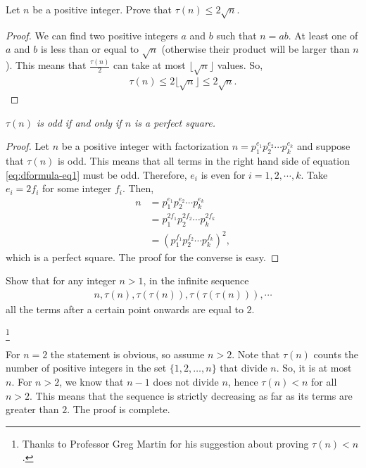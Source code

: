 \documentclass[12pt]{subfile}
\begin{document}
			\begin{theorem}\label{prop:tau(n)<2sqrt(n)}
				Let $n$ be a positive integer. Prove that $\tau(n) \leq 2 \sqrt n$.
			\end{theorem}
			
			\begin{proof}
				We can find two positive integers $a$ and $b$ such that $n=ab$. At least one of $a$ and $b$ is less than or equal to $\sqrt n$ (otherwise their product will be larger than $n$). This means that $\frac{\tau(n)}{2}$ can take at most $\lfloor \sqrt n \rfloor$ values. So,
					\begin{align*}
						\tau(n) \leq 2 \lfloor \sqrt n \rfloor \leq 2 \sqrt n.
					\end{align*}
			\end{proof}
			
			\begin{theorem}\slshape
				$\tau(n)$ is odd if and only if $n$ is a perfect square.
			\end{theorem}
			
			\begin{proof}
				Let $n$ be a positive integer with factorization $n=p_1^{e_1}p_2^{e_2}\cdots p_k^{e_k}$ and suppose that $\tau(n)$ is odd. This means that all terms in the right hand side of equation \eqref{eq:dformula-eq1} must be odd. Therefore, $e_i$ is even for $i=1,2,\cdots,k$. Take $e_i = 2f_i$ for some integer $f_i$. Then,
					\begin{align*}
						n &= p_1^{e_1}p_2^{e_2}\cdots p_k^{e_k}\\
						&= p_1^{2f_1}p_2^{2f_2}\cdots p_k^{2f_k}\\
						&= \left(p_1^{f_1}p_2^{f_2}\cdots p_k^{f_k}\right)^2,
					\end{align*}
				which is a perfect square. The proof for the converse is easy.
			\end{proof}
			
			\begin{problem}
				Show that for any integer $n>1$, in the infinite sequence
					\begin{align*}
						n, \tau(n), \tau(\tau(n)), \tau(\tau(\tau(n))),\cdots
					\end{align*}
				all the terms after a certain point onwards are equal to $2$. %
			\end{problem}
		
			\begin{solution}\footnote{Thanks to Professor Greg Martin for his suggestion about proving $\tau(n)<n$.}
				
				For $n=2$ the statement is obvious, so assume $n >2$. Note that $\tau(n)$ counts the number of positive integers in the set $\{1,2,\ldots,n\}$ that divide $n$. So, it is at most $n$. For $n>2$, we know that $n-1$ does not divide $n$,  hence $\tau(n) < n$ for all $n>2$. This means that the sequence is strictly decreasing as far as its terms are greater than $2$. The proof is complete.
			\end{solution}
\end{document}
